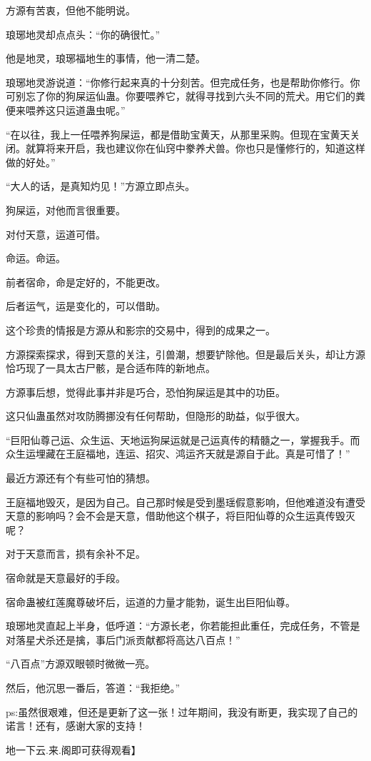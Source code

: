 \begin{this_body}
方源有苦衷，但他不能明说。

琅琊地灵却点点头：“你的确很忙。”

他是地灵，琅琊福地生的事情，他一清二楚。

琅琊地灵游说道：“你修行起来真的十分刻苦。但完成任务，也是帮助你修行。你可别忘了你的狗屎运仙蛊。你要喂养它，就得寻找到六头不同的荒犬。用它们的粪便来喂养这只运道蛊虫呢。”

“在以往，我上一任喂养狗屎运，都是借助宝黄天，从那里采购。但现在宝黄天关闭。就算将来开启，我也建议你在仙窍中豢养犬兽。你也只是懂修行的，知道这样做的好处。”

“大人的话，是真知灼见！”方源立即点头。

狗屎运，对他而言很重要。

对付天意，运道可借。

命运。命运。

前者宿命，命是定好的，不能更改。

后者运气，运是变化的，可以借助。

这个珍贵的情报是方源从和影宗的交易中，得到的成果之一。

方源探索探求，得到天意的关注，引兽潮，想要铲除他。但是最后关头，却让方源恰巧现了一具太古尸骸，是合适布阵的新地点。

方源事后想，觉得此事并非是巧合，恐怕狗屎运是其中的功臣。

这只仙蛊虽然对攻防腾挪没有任何帮助，但隐形的助益，似乎很大。

“巨阳仙尊己运、众生运、天地运狗屎运就是己运真传的精髓之一，掌握我手。而众生运埋藏在王庭福地，连运、招灾、鸿运齐天就是源自于此。真是可惜了！”

最近方源还有个有些可怕的猜想。

王庭福地毁灭，是因为自己。自己那时候是受到墨瑶假意影响，但他难道没有遭受天意的影响吗？会不会是天意，借助他这个棋子，将巨阳仙尊的众生运真传毁灭呢？

对于天意而言，损有余补不足。

宿命就是天意最好的手段。

宿命蛊被红莲魔尊破坏后，运道的力量才能勃，诞生出巨阳仙尊。

琅琊地灵直起上半身，低呼道：“方源长老，你若能担此重任，完成任务，不管是对落星犬杀还是擒，事后门派贡献都将高达八百点！”

“八百点”方源双眼顿时微微一亮。

然后，他沉思一番后，答道：“我拒绝。”

ps:虽然很艰难，但还是更新了这一张！过年期间，我没有断更，我实现了自己的诺言！还有，感谢大家的支持！

地一下云.来.阁即可获得观看】

\end{this_body}

